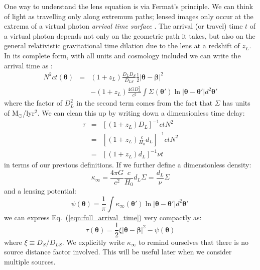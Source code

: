 \documentclass[galley]{mn2e}
\newcommand{\Msun}{\ensuremath{\mathrm{M}_\odot}}
\newcommand{\eqnref}[1] {Eq.~(\ref{#1})}
\renewcommand{\vec}[1]{\ensuremath{\boldsymbol{#1}}}
\begin{document}
One way to understand the lens equation is via Fermat's principle. We can think of light as travelling only 
along extremum paths; lensed images only occur at the extrema of a virtual photon {\it arrival time surface} 
\citep{1986ApJ...310..568B}. The arrival (or travel) time $t$ of a virtual photon depends not only on the geometric
path it takes, but also on the general relativistic gravitational time dilation
due to the lens at a redshift of $z_L$.  In its complete form, with all units
and cosmology included we can write the arrival time as \citep{1986ApJ...310..568B}:
%
\begin{eqnarray}
N^2ct(\vec\theta) & = & (1+z_L)\frac{D_{L}D_{S}}{D_{LS}}\frac12 |\vec\theta - \vec\beta|^2 \nonumber \\
& & - (1+z_L)\frac{4GD_{L}^2}{c^2}\int \Sigma(\vec\theta') \ln |\vec\theta-\vec\theta'| d^2\vec\theta'
\label{eqn:full_arrival_time}
\end{eqnarray}
%
where the factor of $D_L^2$ in the second term comes from the fact that $\Sigma$
has units of \Msun/lyr$^2$. We can clean this up by writing down a dimensionless time
delay:
%
\begin{eqnarray}
\tau & = & \left[(1+z_L)D_{L}\right]^{-1}ctN^2 \nonumber \\
& = & \left[ (1+z_L) \frac{c}{H_0}d_L\right]^{-1}ctN^2 \nonumber \\
& = & \left[ (1+z_L) d_L\right]^{-1}\nu t
\label{tau}
\end{eqnarray}
%
in terms of our previous definitions. If we
further define a dimensionless density:
%
\begin{equation}
\kappa_\infty = \frac{4\pi G}{c^2}\frac{c}{H_0}d_L\Sigma
              = \frac{d_L}{\nu}\Sigma
\end{equation}
%
and a lensing potential:
%
\begin{equation}
\psi(\vec\theta) = \frac1\pi \int \kappa_\infty(\vec\theta') \ln|\vec\theta - \vec\theta'| d^2\vec\theta'\
\label{lensing potential}
\end{equation}
%
we can express \eqnref{eqn:full_arrival_time} very compactly as:
%
\begin{equation}
\tau(\vec\theta) = \frac12 \xi |\vec\theta-\vec\beta|^2 - \psi(\vec\theta)
\label{arrival time}
\end{equation}
%
where $\xi \equiv D_{S}/D_{LS}$. We explicitly write $\kappa_\infty$ to remind ourselves
that there is no source distance factor involved. This will be useful later when we consider
multiple sources.
\end{document}
